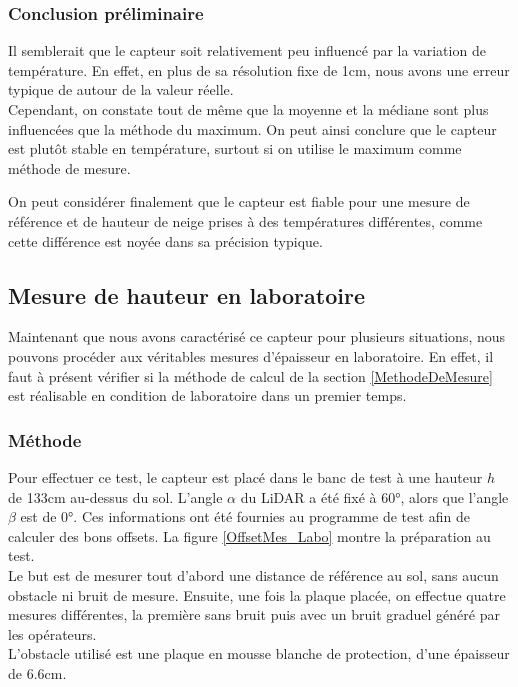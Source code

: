 \subsubsection{Conclusion préliminaire} 

Il semblerait que le capteur soit relativement peu influencé par la variation de température. En
effet, en plus de sa résolution fixe de 1cm, nous avons une erreur typique de \textpm 2cm autour
de la valeur réelle.\\
Cependant, on constate tout de même que la moyenne et la médiane sont plus influencées que la méthode
du maximum. On peut ainsi conclure que le capteur est plutôt stable en température, surtout si on
utilise le maximum comme méthode de mesure.\par 
On peut considérer finalement que le capteur est fiable pour une mesure de référence et de hauteur
de neige prises à des températures différentes, comme cette différence est noyée dans sa précision
typique.

\subsection{Mesure de hauteur en laboratoire}

Maintenant que nous avons caractérisé ce capteur pour plusieurs situations, nous pouvons procéder aux
véritables mesures d'épaisseur en laboratoire. En effet, il faut à présent vérifier si la méthode de
calcul de la section \ref{MethodeDeMesure} est réalisable en condition de laboratoire dans un premier
temps.

\subsubsection{Méthode}

Pour effectuer ce test, le capteur est placé dans le banc de test à une hauteur $h$ de 133cm au-dessus
du sol. L'angle $\alpha$ du LiDAR a été fixé à 60°, alors que l'angle $\beta$ est de 0°. Ces informations 
ont été fournies au programme de test afin de calculer des bons offsets. La figure \ref{OffsetMes_Labo}
montre la préparation au test.\\
Le but est de mesurer tout d'abord une distance de référence au sol, sans aucun obstacle ni bruit de
mesure. Ensuite, une fois la plaque placée, on effectue quatre mesures différentes, la première sans
bruit puis avec un bruit graduel généré par les opérateurs.\\
L'obstacle utilisé est une plaque en mousse blanche de protection, d'une épaisseur de 6.6cm.

